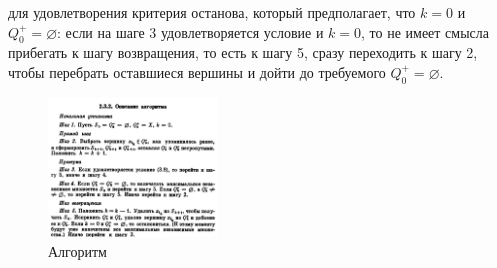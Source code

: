 \documentclass{article}
\begin{document}
\begin{enumerate}
{для удовлетворения критерия останова, который предполагает, что $k = 0$ и $Q_0^{+}=\varnothing$:
если на шаге 3 удовлетворяется условие и $k = 0$, то не имеет смысла прибегать к шагу возвращения, то есть к шагу 5, сразу переходить к шагу 2, чтобы перебрать оставшиеся вершины и дойти до требуемого $Q_0^{+}=\varnothing$.}
\begin{figure}[h]
    \includegraphics[width=0.4\textwidth, center]{attachments/4/algo.png}
    \caption{Алгоритм}
    \label{fig:figure4_algo}
\end{figure}

\end{enumerate}
\end{document}
